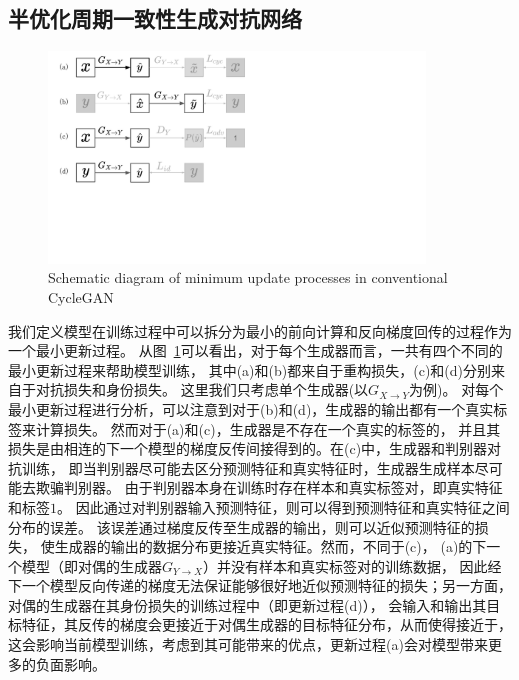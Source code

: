\subsection{半优化周期一致性生成对抗网络}

\begin{figure}[!htp]
    \centering
    \includegraphics[width=10cm,trim=0 150 300 0,clip]{figure/4_dataflow.pdf}
    {Schematic diagram of minimum update processes in conventional CycleGAN}
    \label{fig:dataflow}
\end{figure}

我们定义模型在训练过程中可以拆分为最小的前向计算和反向梯度回传的过程作为一个最小更新过程。
从图~\ref{fig:dataflow}可以看出，对于每个生成器而言，一共有四个不同的最小更新过程来帮助模型训练，
其中(a)和(b)都来自于重构损失，(c)和(d)分别来自于对抗损失和身份损失。
这里我们只考虑单个生成器(以$G_{X\rightarrow Y}$为例)。
对每个最小更新过程进行分析，可以注意到对于(b)和(d)，生成器的输出都有一个真实标签来计算损失。
然而对于(a)和(c)，生成器是不存在一个真实的标签的，
并且其损失是由相连的下一个模型的梯度反传间接得到的。在(c)中，生成器和判别器对抗训练，
即当判别器尽可能去区分预测特征和真实特征时，生成器生成样本尽可能去欺骗判别器。
由于判别器本身在训练时存在样本和真实标签对，即真实特征和标签$1$。
因此通过对判别器输入预测特征，则可以得到预测特征和真实特征之间分布的误差。
该误差通过梯度反传至生成器的输出，则可以近似预测特征的损失，
使生成器的输出的数据分布更接近真实特征。然而，不同于(c)，
(a)的下一个模型（即对偶的生成器$G_{Y\rightarrow X}$）并没有样本和真实标签对的训练数据，
因此经下一个模型反向传递的梯度无法保证能够很好地近似预测特征的损失；另一方面，
对偶的生成器在其身份损失的训练过程中（即更新过程(d)），
会输入和输出其目标特征，其反传的梯度会更接近于对偶生成器的目标特征分布，从而使得接近于，
这会影响当前模型训练，考虑到其可能带来的优点，更新过程(a)会对模型带来更多的负面影响。

